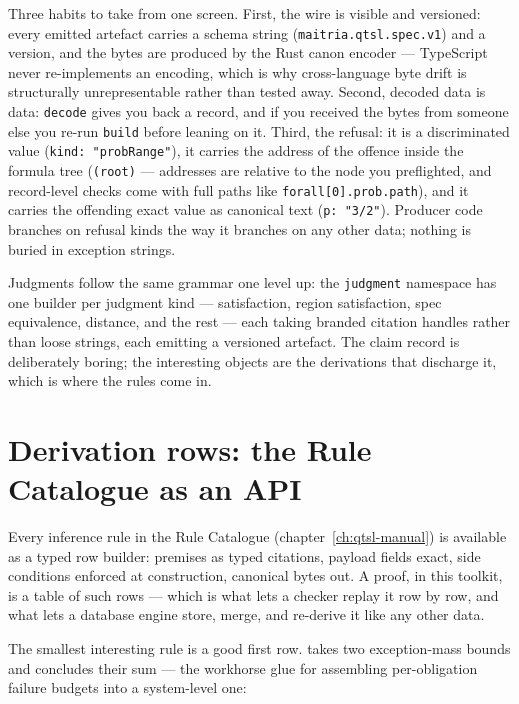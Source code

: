 Three habits to take from one screen. First, the wire is visible and
versioned: every emitted artefact carries a schema string
(\texttt{maitria.qtsl.spec.v1}) and a version, and the bytes are
produced by the Rust canon encoder --- TypeScript never
re-implements an encoding, which is why cross-language byte drift is
structurally unrepresentable rather than tested away. Second,
decoded data is data: \texttt{decode} gives you back a record, and
if you received the bytes from someone else you re-run \texttt{build}
before leaning on it. Third, the refusal: it is a discriminated value
(\texttt{kind: "probRange"}), it carries the address of the offence
inside the formula tree (\texttt{(root)} --- addresses are relative
to the node you preflighted, and record-level checks come with full
paths like \texttt{forall[0].prob.path}), and it carries the
offending exact value as canonical text (\texttt{p: "3/2"}). Producer code branches on refusal kinds the way it
branches on any other data; nothing is buried in exception strings.

Judgments follow the same grammar one level up: the \texttt{judgment}
namespace has one builder per judgment kind --- satisfaction, region
satisfaction, spec equivalence, distance, and the rest --- each
taking branded citation handles rather than loose strings, each
emitting a versioned artefact. The claim record is deliberately
boring; the interesting objects are the derivations that discharge
it, which is where the rules come in.

\section{Derivation rows: the Rule Catalogue as an API}
\label{sec:tut-rules}

Every inference rule in the Rule Catalogue
(chapter~\ref{ch:qtsl-manual}) is available as a typed row builder:
premises as typed citations, payload fields exact, side conditions
enforced at construction, canonical bytes out. A proof, in this
toolkit, is a table of such rows --- which is what lets a checker
replay it row by row, and what lets a database engine store, merge,
and re-derive it like any other data.

The smallest interesting rule is a good first row.
 takes two exception-mass bounds and concludes
their sum --- the workhorse glue for assembling per-obligation
failure budgets into a system-level one:




